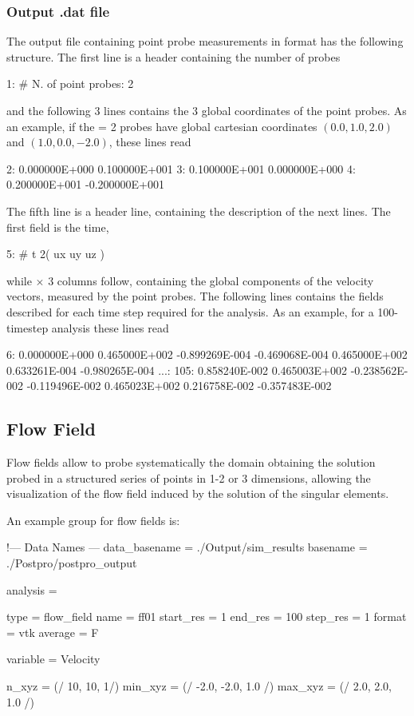 \subsubsection{Output .dat file}

The output file containing point probe measurements in  format has the following structure. The first line is a header containing the number of probes
\begin{inputfile}[frame=single]
 1:  # N. of point probes:           2
\end{inputfile}
and the following 3 lines contains the 3 global coordinates of the point probes. As an example, if the  = 2 probes have global cartesian coordinates $(0.0,1.0,2.0)$ and $(1.0,0.0,-2.0)$, these lines read
\begin{inputfile}[frame=single]
 2:  0.000000E+000  0.100000E+001
 3:  0.100000E+001  0.000000E+000
 4:  0.200000E+001 -0.200000E+001
\end{inputfile}
The fifth line is a header line, containing the description of the next lines. The first field is the time,
\begin{inputfile}[frame=single]
 5:  #    t     2(   ux  uy  uz )
\end{inputfile}
while  $\times$ 3 columns follow, containing the global components of the velocity vectors, measured by the point probes. The following lines contains the fields described for each time step required for the analysis. As an example, for a 100-timestep analysis these lines read
\begin{inputfile}[frame=single]
  6: 0.000000E+000  0.465000E+002  -0.899269E-004  -0.469068E-004  0.465000E+002
     0.633261E-004 -0.980265E-004   
...:
105: 0.858240E-002  0.465003E+002  -0.238562E-002  -0.119496E-002  0.465023E+002
     0.216758E-002 -0.357483E-002
\end{inputfile}

\subsection{Flow Field}

Flow fields allow to probe systematically the domain obtaining the solution probed in a structured series of points in 1-2 or 3 dimensions, allowing the visualization of the flow field induced by the solution of the singular elements.

An example  group for flow fields is:

\begin{inputfile}[frame=single, caption={dust\_post.in for flow fields}, label={file:dust_post.in_flow_fields}]
!--- Data Names ---
data_basename = ./Output/sim_results
basename =     ./Postpro/postpro_output

analysis = {

type = flow_field
name = ff01
start_res = 1
end_res   = 100 
step_res  = 1
format = vtk
average = F

variable = Velocity

n_xyz = (/ 10, 10, 1/)
min_xyz = (/ -2.0, -2.0, 1.0 /)
max_xyz = (/ 2.0, 2.0, 1.0 /)
}
\end{inputfile}

